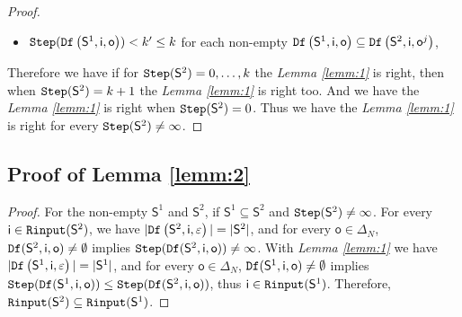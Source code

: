 \begin{appendices}
\begin{proof}
\begin{itemize}
 \item  ${\tt Step}({\tt Df}\left(\mathsf{S}^{1},\mathsf{i},\mathsf{o}\right))<k'\le k$ for each non-empty ${\tt Df}\left(\mathsf{S}^{1},\mathsf{i},\mathsf{o}\right)\subseteq {\tt Df}\left(\mathsf{S}^{2},\mathsf{i},\mathsf{o}^{j}\right)$,
 \end{itemize} 
 Therefore we have if for ${\tt Step}(\mathsf{S}^{2})=0,\ldots, k$ the {\em Lemma \ref{lemm:1}} is right, then when ${\tt Step}(\mathsf{S}^{2})=k+1$ the {\em Lemma \ref{lemm:1}} is right too. 
And we have the {\em Lemma \ref{lemm:1}} is right when ${\tt Step}(\mathsf{S}^{2})=0$. Thus we have the {\em Lemma \ref{lemm:1}} is right for every ${\tt Step}(\mathsf{S}^{2})\ne \infty$.
 
\end{proof}
\subsection{Proof of Lemma \ref{lemm:2}}
\begin{proof}
For the non-empty $\mathsf{S}^{1}$ and $\mathsf{S}^{2}$, if $\mathsf{S}^{1}\subseteq\mathsf{S}^{2}$ and ${\tt Step}(\mathsf{S}^{2})\ne\infty$.
For every $\mathsf{i}\in {\tt Rinput}(\mathsf{S}^2)$, we have  $|{\tt Df}\left(\mathsf{S}^2,\mathsf{i},\varepsilon\right)|=|\mathsf{S}^2|$, and 
for every $\mathsf{o} \in \Delta_N$, ${\tt Df}(\mathsf{S}^2,\mathsf{i},\mathsf{o})\ne \emptyset$ implies ${\tt Step}({\tt Df}(\mathsf{S}^2,\mathsf{i},\mathsf{o}))\ne \infty$. With {\em Lemma \ref{lemm:1}} we have $|{\tt Df}\left(\mathsf{S}^1,\mathsf{i},\varepsilon\right)|=|\mathsf{S}^1|$, and 
for every $\mathsf{o} \in \Delta_N$, ${\tt Df}(\mathsf{S}^1,\mathsf{i},\mathsf{o})\ne \emptyset$ implies ${\tt Step}({\tt Df}(\mathsf{S}^1,\mathsf{i},\mathsf{o}))\le {\tt Step}({\tt Df}(\mathsf{S}^2,\mathsf{i},\mathsf{o}))$, thus $\mathsf{i}\in {\tt Rinput}(\mathsf{S}^1)$. Therefore, ${\tt Rinput}(\mathsf{S}^2)\subseteq{\tt Rinput}(\mathsf{S}^1)$.
\end{proof}



\end{appendices}
